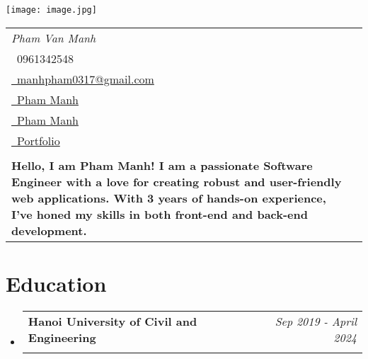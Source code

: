 \documentclass[a4paper,11pt]{article}
\makeatletter
\newcommand{\resumeSubheading}[4]{
\vspace{0.5mm}\item
    \begin{tabular*}{0.98\textwidth}[t]{l@{\extracolsep{\fill}}r}
        \textbf{#1} & \textit{\footnotesize{#4}} \\
        \textit{\footnotesize{#3}} &  \footnotesize{#2}\\
    \end{tabular*}
    \vspace{-2.4mm}
}
\newcommand{\resumeSubHeadingListStart}{\begin{itemize}[leftmargin=*,labelsep=0mm]}
\newcommand{\resumeSubHeadingListEnd}{\end{itemize}\vspace{2mm}}
\newcommand{\name}{Pham Van Manh} %
\newcommand{\phone}{0961342548} %
\newcommand{\emaila}{manhpham0317@gmail.com} %
\newcommand{\accountName}{Pham Manh} %
\newcommand{\headline}{Hello, I am Pham Manh! I am a passionate Software Engineer with a love for creating robust and user-friendly web applications. With 3 years of hands-on experience, I’ve honed my skills in both front-end and back-end development.}
\makeatother
\begin{document}
\selectfont


\parbox{2.6cm}{%
\texttt{[image: image.jpg]}
}
\parbox{\dimexpr\linewidth-2.9cm\relax}{
\begin{tabularx}{\linewidth}{L r} \\
  \textit{\Large \name} \\ {\raisebox{0.0\height}{\footnotesize \faPhone}\ \phone}\\
\href{mailto:\emaila}{\raisebox{0.0\height}{\footnotesize \faEnvelope}\ {\emaila}} \\
 \href{https://github.com/manhpvxj}{\raisebox{0.0\height}{\footnotesize \faGithub}\ {\accountName}} \\
  \href{https://www.linkedin.com/in/manhpvxj/}{\raisebox{0.0\height}{\footnotesize \faLinkedin}\ {\accountName}} \\
  \href{https:/manhtheweeb.id.vn}{\raisebox{0.0\height}{\footnotesize \faLink}\ {Portfolio}} \\ \\
  \textbf{\headline}
\end{tabularx}
}





\section{\textbf{Education}}
  \resumeSubHeadingListStart
    \resumeSubheading
      {Hanoi University of Civil and Engineering}{}
      {}{Sep 2019 - April 2024}
  \resumeSubHeadingListEnd
  
%



\end{document}
